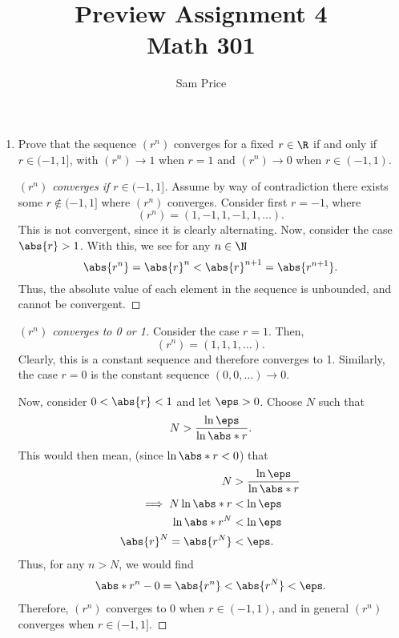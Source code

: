 \documentclass{article}
\author{Sam Price}
\date{}
\title{Preview Assignment 4\\\Large{Math 301}}
\begin{document}
\maketitle

\begin{enumerate}
  \item Prove that the sequence $(r^{n})$ converges for a fixed $r \in \R$ if and only if $r \in \lparen-1, 1\rbrack$, with $(r^{n}) \to 1$
        when $r = 1$ and $(r^{n}) \to 0$ when $r \in (-1, 1)$.\\
        \begin{proof}[$(r^{n})$ converges if $r \in \lparen -1, 1 \rbrack$]
          Assume by way of contradiction there exists some $r \notin \lparen -1, 1 \rbrack$ where $(r^{n})$ converges.
          Consider first $r = -1$, where
          \[
            (r^{n}) = (1, -1, 1, -1, 1, \ldots).
          \]
          This is not convergent, since it is clearly alternating. Now, consider the case $\abs{r} > 1$.
          With this, we see for any $n \in \N$
          \[
            \abs{r^{n}} = \abs{r}^{n} < \abs{r}^{n + 1} = \abs{r^{n + 1}}.
          \]
          Thus, the absolute value of each element in the sequence is unbounded, and cannot be convergent.
        \end{proof}
        \begin{proof}[$(r^{n})$ converges to 0 or 1]
          Consider the case $r = 1$. Then,
          \[
            (r^{n}) = (1, 1, 1, \ldots).
          \]
          Clearly, this is a constant sequence and therefore converges to 1.
          Similarly, the case $r = 0$ is the constant sequence $(0, 0, \ldots) \to 0$.

          Now, consider $0 < \abs{r} < 1$ and let $\eps > 0$.
          Choose $N$ such that
          \[
            N > \frac{\ln \eps}{\ln \abs*{r}}.
          \]
          This would then mean, (since $\ln \abs*{r} < 0$) that
          \begin{align*}
            N &> \frac{\ln \eps}{\ln \abs*{r}}\\
            \implies N \ln \abs*{r} &< \ln \eps\\
            \ln \abs*{r}^{N} &< \ln \eps\\
            \abs{r}^{N} = \abs{r^{N}} &< \eps.
          \end{align*}
          Thus, for any $n > N$, we would find
          \begin{align*}
            \abs*{r^{n} - 0} = \abs{r^{n}} < \abs{r^{N}} < \eps.
          \end{align*}
          Therefore, $(r^{n})$ converges to 0 when $r \in (-1, 1)$, and in general $(r^{n})$ converges when $r \in \lparen -1, 1 \rbrack$.


\end{proof}
\end{enumerate}
\end{document}

